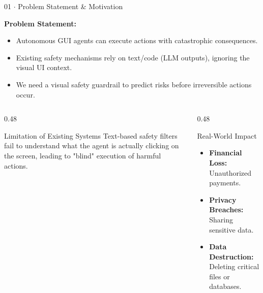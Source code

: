 \documentclass[aspectratio=169, 10pt]{beamer}
\begin{document}
\begin{frame}{01 $\cdot$ Problem Statement \& Motivation}

    \textbf{Problem Statement:}

    \begin{itemize}
        \item Autonomous GUI agents can execute actions with catastrophic consequences.
        \item Existing safety mechanisms rely on text/code (LLM outputs), ignoring the visual UI context.
        \item We need a visual safety guardrail to predict risks before irreversible actions occur.
    \end{itemize}

    \vspace{0.2cm}

    \begin{columns}[T]

        \begin{column}{0.48\textwidth}

            \begin{alertblock}{Limitation of Existing Systems}
                Text-based safety filters fail to understand what the agent is actually clicking on the screen, leading to "blind" execution of harmful actions.
            \end{alertblock}

        \end{column}

        \begin{column}{0.48\textwidth}

            \begin{block}{Real-World Impact}
                \begin{itemize}
                    \item \textbf{Financial Loss:} Unauthorized payments.
                    \item \textbf{Privacy Breaches:} Sharing sensitive data.
                    \item \textbf{Data Destruction:} Deleting critical files or databases.
                \end{itemize}
            \end{block}

        \end{column}

    \end{columns}

\end{frame}
\end{document}
